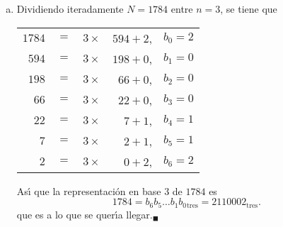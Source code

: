 \begin{solucion}
\begin{enumerate}[(a)]
  \item Dividiendo iteradamente $N=1784$ entre $n=3$, se tiene que
  \begin{center}
   \begin{tabular}{rclrr}
    $1784$ & $=$ & $3\times$ & $594 + 2$, & $b_0 = 2$ \\
    $594$ & $=$ & $3\times$ & $198 + 0$, & $b_1 = 0$ \\
    $198$  & $=$ & $3\times$ & $66 + 0$, & $b_2 = 0$ \\
    $66$ & $=$ & $3\times$ & $22 + 0$, & $b_3 = 0$ \\
    $22$  & $=$ & $3\times$ & $7 + 1$, & $b_4 = 1$ \\
    $7$  & $=$ & $3\times$ & $2 + 1$, & $b_5 = 1$ \\
    $2$  & $=$ & $3\times$ & $0 + 2$, & $b_6 = 2$
   \end{tabular}
  \end{center}
  As\'{\i} que la representaci\'on en base $3$ de $1784$ es
  \begin{equation*}
   1784 = b_6 b_5 \ldots  b_1 b_{0}{}_{\text{tres}} = 2110002_{\text{tres}}.
  \end{equation*}
  que es a lo que se quer\'{\i}a llegar.${}_{\blacksquare}$
 \end{enumerate}
\end{solucion}
